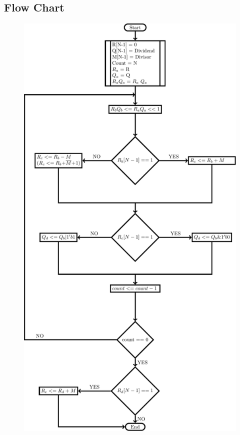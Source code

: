 \documentclass{article}
\begin{document}
\subsection{Flow Chart}
\begin{figure}[H]
    \centering
    \includegraphics[scale=0.9]{../Resources/TexFiles/NonRestoringDivision.pdf}
\end{figure}
\end{document}
